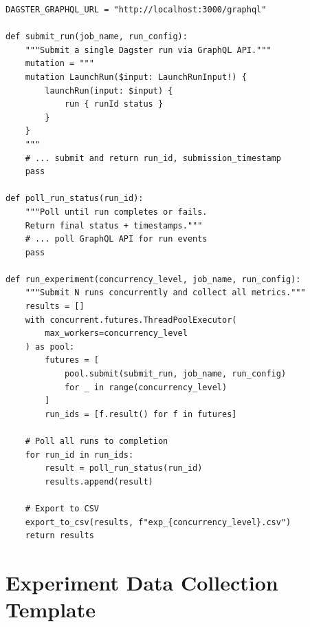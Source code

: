 \begin{appendices}
\begin{lstlisting}[style=python, caption={Test harness pseudocode for concurrent Dagster run submission.}, label={lst:test-harness}]
DAGSTER_GRAPHQL_URL = "http://localhost:3000/graphql"

def submit_run(job_name, run_config):
    """Submit a single Dagster run via GraphQL API."""
    mutation = """
    mutation LaunchRun($input: LaunchRunInput!) {
        launchRun(input: $input) {
            run { runId status }
        }
    }
    """
    # ... submit and return run_id, submission_timestamp
    pass

def poll_run_status(run_id):
    """Poll until run completes or fails.
    Return final status + timestamps."""
    # ... poll GraphQL API for run events
    pass

def run_experiment(concurrency_level, job_name, run_config):
    """Submit N runs concurrently and collect all metrics."""
    results = []
    with concurrent.futures.ThreadPoolExecutor(
        max_workers=concurrency_level
    ) as pool:
        futures = [
            pool.submit(submit_run, job_name, run_config)
            for _ in range(concurrency_level)
        ]
        run_ids = [f.result() for f in futures]

    # Poll all runs to completion
    for run_id in run_ids:
        result = poll_run_status(run_id)
        results.append(result)

    # Export to CSV
    export_to_csv(results, f"exp_{concurrency_level}.csv")
    return results
\end{lstlisting}

\chapter{Experiment Data Collection Template}
\label{app:data-template}


\end{appendices}

